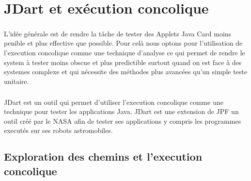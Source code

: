 \chapter{JDart et exécution concolique}
  \paragraph{}
    L'idée générale est de rendre la tâche de tester des Applets Java Card moins penible et plus effective que possible.
    Pour celà nous optons pour l'utilisation de l'execution concolique comme une technique d'analyse ce qui permet de rendre 
    le system à tester moins obscue et plus predictible surtout quand on est face à des systemes complexe
    et qui nécessite des méthodes plus avancées qu'un simple teste unitaire.
  \paragraph{}
    JDart est un outil qui permet d'utiliser l'execution concolique comme une technique pour tester les applications Java.
    \newline
    JDart est une extension de \gls{JPF} un outil créé par le NASA afin de tester ses applications y compris les programmes executés sur ses robots astromobiles.
  \section{Exploration des chemins et l'execution concolique}
